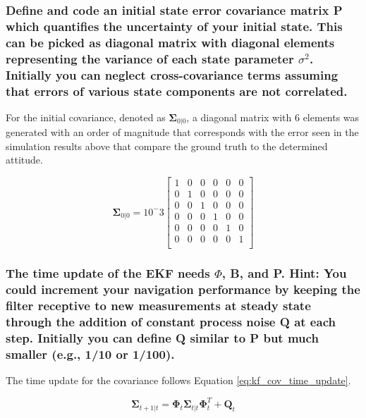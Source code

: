 \subsubsection{Define and code an initial state error covariance matrix P which quantifies the uncertainty of your initial state. This can be picked as diagonal matrix with diagonal elements representing the variance of each state parameter $\sigma ^2$. Initially you can neglect cross-covariance terms assuming that errors of various state components are not correlated.}

For the initial covariance, denoted as $\boldsymbol{\Sigma}_{0 \vert 0}$, a diagonal matrix with 6 elements was generated with an order of magnitude that corresponds with the error seen in the simulation results above that compare the ground truth to the determined attitude.

\begin{equation*}
    \boldsymbol{\Sigma}_{0 \vert 0} = 10^-3 \begin{bmatrix}
        1 & 0 & 0 & 0 & 0 & 0 \\
        0 & 1 & 0 & 0 & 0 & 0 \\
        0 & 0 & 1 & 0 & 0 & 0 \\
        0 & 0 & 0 & 1 & 0 & 0 \\
        0 & 0 & 0 & 0 & 1 & 0 \\
        0 & 0 & 0 & 0 & 0 & 1 \\
    \end{bmatrix}
\end{equation*}

\subsubsection{The time update of the EKF needs $\Phi$, B, and P. Hint: You could increment your navigation performance by keeping the filter receptive to new measurements at steady state through the addition of constant process noise Q at each step. Initially you can define Q similar to P but much smaller (e.g., 1/10 or 1/100).}

The time update for the covariance follows Equation \ref{eq:kf_cov_time_update}.

\begin{equation} \label{eq:kf_cov_time_update}
    \boldsymbol{\Sigma}_{t + 1 \vert t} = \boldsymbol{\Phi}_t \boldsymbol{\Sigma}_{t \vert t} \boldsymbol{\Phi}_t^T + \boldsymbol{Q}_t
\end{equation}

